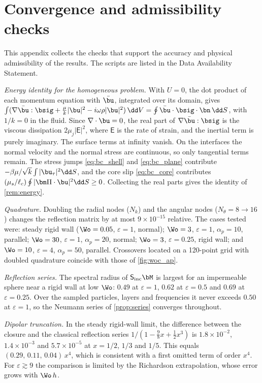 \section{Convergence and admissibility checks}\label{app:checks}
This appendix collects the checks that support the accuracy and physical admissibility of the results. The scripts
are listed in the Data Availability Statement.

\emph{Energy identity for the homogeneous problem.} With $U=0$, the dot product of each momentum equation with
$\bar\bu$, integrated over its domain, gives
$\int(\nabla\bar\bu:\bsig+\tfrac{\mu}{k}|\bu|^2-i\omega\rho|\bu|^2)\,\dd V=\oint\bar\bu\cdot\bsig\cdot\bn\,\dd S$, with
$1/k=0$ in the fluid. Since $\nabla\cdot\bu=0$, the real part of $\nabla\bar\bu:\bsig$ is the viscous dissipation
$2\mu_j|\mathsf E|^2$, where $\mathsf E$ is the rate of strain, and the inertial term is purely imaginary. The surface
terms at infinity vanish. On the interfaces the normal velocity and the normal stress are continuous, so only
tangential terms remain. The stress jumps \eqref{eq:bc_shell} and \eqref{eq:bc_plane} contribute
$-\beta\mu/\sqrt k\int|\bu_\tau|^2\dd S$, and the core slip \eqref{eq:bc_core} contributes
$(\mu_s/\ell_c)\oint|\bm\Pi\cdot\bu|^2\dd S\ge0$. Collecting the real parts gives the identity of \cref{rem:energy}.

\emph{Quadrature.} Doubling the radial nodes ($N_k$) and the angular nodes ($N_\theta=8\to16$) changes the reflection
matrix by at most $9\times10^{-15}$ relative. The cases tested were: steady rigid wall ($\Wo=0.05$, $\varepsilon=1$,
normal); $\Wo=3$, $\varepsilon=1$, $\alpha_p=10$, parallel; $\Wo=30$, $\varepsilon=1$, $\alpha_p=20$, normal; $\Wo=3$,
$\varepsilon=0.25$, rigid wall; and $\Wo=10$, $\varepsilon=4$, $\alpha_p=50$, parallel. Crossovers located on a
120-point grid with doubled quadrature coincide with those of \cref{fig:woc_ap}.

\emph{Reflection series.} The spectral radius of $\mathsf S_{\rm inc}\bM$ is largest for an impermeable sphere near a
rigid wall at low $\Wo$: $0.49$ at $\varepsilon=1$, $0.62$ at $\varepsilon=0.5$ and $0.69$ at $\varepsilon=0.25$. Over
the sampled particles, layers and frequencies it never exceeds $0.50$ at $\varepsilon=1$, so the Neumann series of
\cref{prop:series} converges throughout.

\emph{Dipolar truncation.} In the steady rigid-wall limit, the difference between the closure and the classical
reflection series $1/(1-\tfrac98x+\tfrac12x^3)$ is $1.8\times10^{-2}$, $1.4\times10^{-3}$ and $5.7\times10^{-5}$ at
$x=1/2$, $1/3$ and $1/5$. This equals $(0.29,\,0.11,\,0.04)\,x^4$, which is consistent with a first omitted term of order
$x^4$. For $\varepsilon\gtrsim9$ the comparison is limited by the Richardson extrapolation, whose error grows with
$\Wo\,h$.

